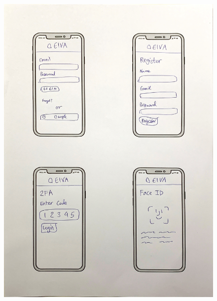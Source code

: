 \documentclass{article}
\begin{document}
\begin{figure}
\begin{minipage}{.5\textwidth}
		\includegraphics[width=1\linewidth]{drawing-phone-2.jpg}
	\end{minipage}%
	\begin{minipage}{.5\textwidth}
		\centering

\end{minipage}
\end{figure}
\end{document}
